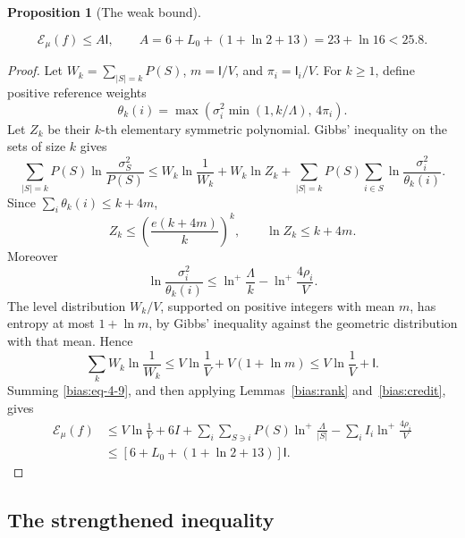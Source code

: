\documentclass[11pt]{amsart}
\newtheorem{proposition}[theorem]{Proposition}
\theoremstyle{definition}
\theoremstyle{remark}
\newcommand{\I}{\mathsf I}
\begin{document}
\begin{proposition}[The weak bound]\label{bias:weak}

\begin{equation}\label{bias:eq-4-8}
\mathcal E_\mu(f)\le A \I,\qquad
 A=6+L_0+(1+\ln2+13)=23+\ln16<25.8.
\end{equation}

\end{proposition}
\begin{proof}

Let \(W_k=\sum_{|S|=k}P(S)\), \(m=\I/V\), and \(\pi_i=\I_i/V\). For \(k\ge1\), define positive reference weights \[
 \theta_k(i)=
 \max\left(\sigma_i^2\min(1,k/\Lambda),\,4\pi_i\right).
\] Let \(Z_k\) be their \(k\)-th elementary symmetric polynomial. Gibbs' inequality on the sets of size \(k\) gives \begin{equation}\label{bias:eq-4-9}
\sum_{|S|=k}P(S)\ln\frac{\sigma_S^2}{P(S)}
 \le W_k\ln\frac1{W_k}+W_k\ln Z_k
       +\sum_{|S|=k}P(S)\sum_{i\in S}
           \ln\frac{\sigma_i^2}{\theta_k(i)}.
\end{equation} Since \(\sum_i\theta_k(i)\le k+4m\), \[
 Z_k\le\left(\frac{e(k+4m)}k\right)^k,\qquad
 \ln Z_k\le k+4m.
\] Moreover \[
 \ln\frac{\sigma_i^2}{\theta_k(i)}
 \le\ln^+\frac\Lambda k-\ln^+\frac{4\rho_i}{V}.
\] The level distribution \(W_k/V\), supported on positive integers with mean \(m\), has entropy at most \(1+\ln m\), by Gibbs' inequality against the geometric distribution with that mean. Hence \[
 \sum_kW_k\ln\frac1{W_k}
 \le V\ln\frac1V+V(1+\ln m)
 \le V\ln\frac1V+\I.
\] Summing \eqref{bias:eq-4-9}, and then applying Lemmas~\ref{bias:rank} and~\ref{bias:credit}, gives \[
 \begin{aligned}
 \mathcal E_\mu(f)
 &\le V\ln\frac1V+6I
      +\sum_i\sum_{S\ni i}P(S)\ln^+\frac\Lambda{|S|}
      -\sum_iI_i\ln^+\frac{4\rho_i}{V}\\
 &\le[6+L_0+(1+\ln2+13)]\I.
 \end{aligned}
\]

\end{proof}

\subsection{The strengthened inequality}\label{bias:strong-section}
\end{document}
